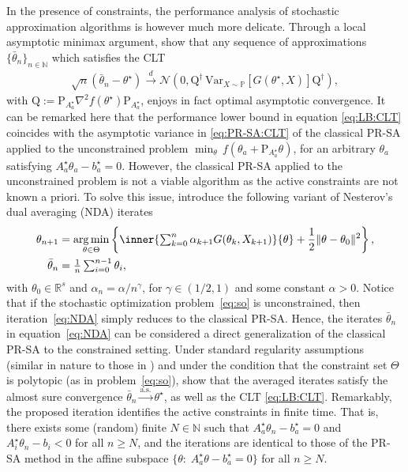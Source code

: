 \documentclass[11pt,a4paper]{article}
\theoremstyle{definition}
\DeclareMathOperator*{\argmin}{arg\,min}
\begin{document}
In the presence of constraints, the performance analysis of stochastic approximation algorithms is however much more delicate.
Through a local asymptotic minimax argument, \citet[Theorems~1 and 4]{duchi2021asymptotic} show that any sequence of approximations $\{\bar \theta_n\}_{n \in \mathbb N}$ which satisfies the CLT
\begin{align}
\label{eq:LB:CLT}
    \sqrt{n}\left( \bar{\theta}_n - \theta^\star \right) \overset{d}{\to} \mathcal N \left(0, \text{Q}^{\dagger}\, \text{Var}_{X \sim \mathbb P}\left[G(\theta^\star,X)\right] \text{Q}^{\dagger} \right),
\end{align}
with $\text{Q}:=\text{P}_{A^\star_{a}}\nabla^2  f(\theta^\star) \text{P}_{A^\star_{a}}$,
enjoys in fact optimal asymptotic convergence. It can be remarked here that the performance lower bound in equation \eqref{eq:LB:CLT} coincides with the asymptotic variance in \eqref{eq:PR-SA:CLT} of the classical PR-SA applied to the unconstrained problem $\min_\theta\, {f}(\theta_a + \text{P}_{A^\star_a}\theta)$, for an arbitrary $\theta_a$ satisfying $A^\star_{a} \theta_a - b^\star_a=0$.
However, the classical PR-SA applied to the unconstrained problem is not a viable algorithm as the active constraints are not known a priori. 
To solve this issue, \citet{duchi2021asymptotic} introduce the following variant of Nesterov's dual averaging (NDA) \cite{nesterov2009primal} iterates
\begin{align}
\label{eq:NDA}
\begin{split}
    \theta_{n+1} &= \argmin_{\theta \in \Theta} \left\{ \inner{\textstyle\sum_{k=0}^n \alpha_{k+1} G(\theta_k, X_{k+1})}{\theta} +\frac{1}{2} \| \theta - \theta_{0} \|^2\right\},\\
    \bar{\theta}_n &= \textstyle\frac{1}{n} \sum_{i=0}^{n-1} \theta_i,
\end{split}
\end{align}
with $\theta_0 \in \mathbb R^s$ and $\alpha_n = \alpha/n^\gamma$, for $\gamma \in (1/2,1)$ and some constant $\alpha>0$.
Notice that if the stochastic optimization problem~\eqref{eq:so} is unconstrained, then iteration~\eqref{eq:NDA} simply reduces to the classical PR-SA.
Hence, the iterates $\bar \theta_n$ in equation~\eqref{eq:NDA} can be considered a direct generalization of the classical PR-SA to the constrained setting.
Under standard regularity assumptions (similar in nature to those in \citet{polyak1992acceleration}) and under the condition that the constraint set $\Theta$ is polytopic (as in problem~\eqref{eq:so}), \citet{duchi2021asymptotic} show that the averaged iterates satisfy the almost sure convergence $\bar{\theta}_n \overset{\text{a.s.}}{\to} \theta^\star$, as well as the CLT \eqref{eq:LB:CLT}. Remarkably, the proposed iteration identifies the active constraints in finite time. 
That is, there exists some (random) finite $N \in \mathbb N$ such that $A^\star_{a} \theta_n - b^\star_a=0$ and $A^\star_{i} \theta_n - b_i<0$ for all $n \geq N$, and the iterations are identical to those of the PR-SA method in the affine subspace $\{\theta :\; A^\star_{a} \theta - b^\star_a=0\}$ for all $n \geq N$. 
\end{document}
